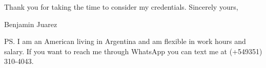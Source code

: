 Thank you for taking the time to consider my credentials.
\midskip 
Sincerely yours,


Benjamin Juarez

PS. I am an American living in Argentina and am flexible in work hours
and salary. If you want to reach me through WhatsApp you can text me at
(+549351) 310-4043.

